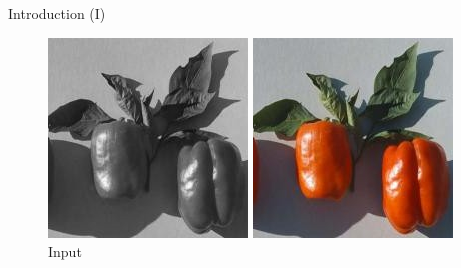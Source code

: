 \documentclass{beamer}
\begin{document}
\begin{frame}{Introduction (I)}
  \begin{figure}[!htb]
      \includegraphics[width=\linewidth]{resources/bw.jpg}
      \caption{Input}
    \endminipage\hfill
      \includegraphics[width=\linewidth]{resources/gt.jpg}

\end{figure}
\end{frame}
\end{document}
